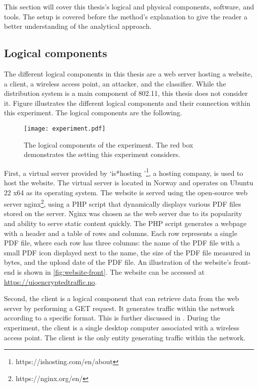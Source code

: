 This section will cover this thesis's logical and physical components, software, and tools. The setup is covered before the method's explanation to give the reader a better understanding of the analytical approach.

\subsection{Logical components\label{subsec:network-methodology}}

The different logical components in this thesis are a web server hosting a website, a client, a wireless access point, an attacker, and the classifier. While the distribution system is a main component of 802.11, this thesis does not consider it. Figure  illustrates the different logical components and their connection within this experiment. The logical components are the following.

\begin{figure}
        \texttt{[image: experiment.pdf]}
        \caption{The logical components of the experiment. The red box demonstrates the setting this experiment considers.}
    \label{fig:logicalcomponents}
\end{figure}

First, a virtual server provided by `is*hosting '\footnote{https://ishosting.com/en/about}, a hosting company, is used to host the website. The virtual server is located in Norway and operates on Ubuntu 22 x64 as its operating system. The website is served using the open-source web server nginx\footnote{https://nginx.org/en/}, using a PHP script that dynamically displays various PDF files stored on the server. Nginx was chosen as the web server due to its popularity and ability to serve static content quickly. The PHP script generates a webpage with a header and a table of rows and columns. Each row represents a single PDF file, where each row has three columns: the name of the PDF file with a small PDF icon displayed next to the name, the size of the PDF file measured in bytes, and the upload date of the PDF file. An illustration of the website's front-end is shown in \cref{fig:website-front}. The website can be accessed at \url{https://uioencryptedtraffic.no}.

Second, the client is a logical component that can retrieve data from the web server by performing a GET request. It generates traffic within the network according to a specific format. This is further discussed in . During the experiment, the client is a single desktop computer associated with a wireless access point. The client is the only entity generating traffic within the network.

